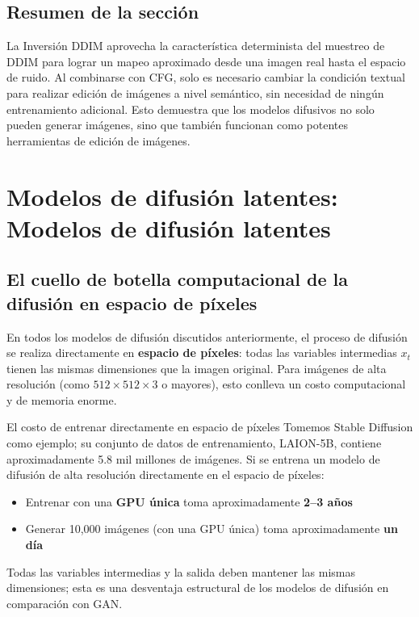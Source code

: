 \documentclass[a4paper]{article}
\begin{document}
\subsection{Resumen de la sección}

La Inversión DDIM aprovecha la característica determinista del muestreo de DDIM para lograr un mapeo aproximado desde una imagen real hasta el espacio de ruido. Al combinarse con CFG, solo es necesario cambiar la condición textual para realizar edición de imágenes a nivel semántico, sin necesidad de ningún entrenamiento adicional. Esto demuestra que los modelos difusivos no solo pueden generar imágenes, sino que también funcionan como potentes herramientas de edición de imágenes.

\newpage
\section{Modelos de difusión latentes: Modelos de difusión latentes}

\subsection{El cuello de botella computacional de la difusión en espacio de píxeles}

En todos los modelos de difusión discutidos anteriormente, el proceso de difusión se realiza directamente en \textbf{espacio de píxeles}: todas las variables intermedias $x_t$ tienen las mismas dimensiones que la imagen original. Para imágenes de alta resolución (como $512\times512\times3$ o mayores), esto conlleva un costo computacional y de memoria enorme.

\begin{warningbox}{El costo de entrenar directamente en espacio de píxeles}
Tomemos Stable Diffusion como ejemplo; su conjunto de datos de entrenamiento, LAION-5B, contiene aproximadamente 5.8 mil millones de imágenes. Si se entrena un modelo de difusión de alta resolución directamente en el espacio de píxeles:
\begin{itemize}
    \item Entrenar con una \textbf{GPU única} toma aproximadamente \textbf{2--3 años}
    \item Generar 10,000 imágenes (con una GPU única) toma aproximadamente \textbf{un día}
\end{itemize}
Todas las variables intermedias y la salida deben mantener las mismas dimensiones; esta es una desventaja estructural de los modelos de difusión en comparación con GAN.
\end{warningbox}
\end{document}
